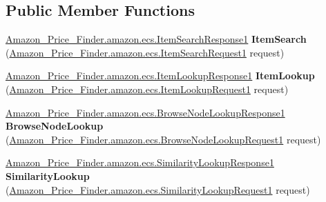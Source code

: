 \subsection*{Public Member Functions}
\begin{DoxyCompactItemize}
\item 
\hypertarget{interface_amazon___price___finder_1_1amazon_1_1ecs_1_1_a_w_s_e_commerce_service_port_type_a4d87bbbe4bbbd83c4d10e0db44b3217e}{\hyperlink{class_amazon___price___finder_1_1amazon_1_1ecs_1_1_item_search_response1}{Amazon\-\_\-\-Price\-\_\-\-Finder.\-amazon.\-ecs.\-Item\-Search\-Response1} {\bfseries Item\-Search} (\hyperlink{class_amazon___price___finder_1_1amazon_1_1ecs_1_1_item_search_request1}{Amazon\-\_\-\-Price\-\_\-\-Finder.\-amazon.\-ecs.\-Item\-Search\-Request1} request)}\label{interface_amazon___price___finder_1_1amazon_1_1ecs_1_1_a_w_s_e_commerce_service_port_type_a4d87bbbe4bbbd83c4d10e0db44b3217e}

\item 
\hypertarget{interface_amazon___price___finder_1_1amazon_1_1ecs_1_1_a_w_s_e_commerce_service_port_type_a297e272c59b05a1d858330541b12323f}{\hyperlink{class_amazon___price___finder_1_1amazon_1_1ecs_1_1_item_lookup_response1}{Amazon\-\_\-\-Price\-\_\-\-Finder.\-amazon.\-ecs.\-Item\-Lookup\-Response1} {\bfseries Item\-Lookup} (\hyperlink{class_amazon___price___finder_1_1amazon_1_1ecs_1_1_item_lookup_request1}{Amazon\-\_\-\-Price\-\_\-\-Finder.\-amazon.\-ecs.\-Item\-Lookup\-Request1} request)}\label{interface_amazon___price___finder_1_1amazon_1_1ecs_1_1_a_w_s_e_commerce_service_port_type_a297e272c59b05a1d858330541b12323f}

\item 
\hypertarget{interface_amazon___price___finder_1_1amazon_1_1ecs_1_1_a_w_s_e_commerce_service_port_type_a74338b088576c8ef7243827a13f98376}{\hyperlink{class_amazon___price___finder_1_1amazon_1_1ecs_1_1_browse_node_lookup_response1}{Amazon\-\_\-\-Price\-\_\-\-Finder.\-amazon.\-ecs.\-Browse\-Node\-Lookup\-Response1} {\bfseries Browse\-Node\-Lookup} (\hyperlink{class_amazon___price___finder_1_1amazon_1_1ecs_1_1_browse_node_lookup_request1}{Amazon\-\_\-\-Price\-\_\-\-Finder.\-amazon.\-ecs.\-Browse\-Node\-Lookup\-Request1} request)}\label{interface_amazon___price___finder_1_1amazon_1_1ecs_1_1_a_w_s_e_commerce_service_port_type_a74338b088576c8ef7243827a13f98376}

\item 
\hypertarget{interface_amazon___price___finder_1_1amazon_1_1ecs_1_1_a_w_s_e_commerce_service_port_type_a4d075270ca3bc355d5a9af8833790f78}{\hyperlink{class_amazon___price___finder_1_1amazon_1_1ecs_1_1_similarity_lookup_response1}{Amazon\-\_\-\-Price\-\_\-\-Finder.\-amazon.\-ecs.\-Similarity\-Lookup\-Response1} {\bfseries Similarity\-Lookup} (\hyperlink{class_amazon___price___finder_1_1amazon_1_1ecs_1_1_similarity_lookup_request1}{Amazon\-\_\-\-Price\-\_\-\-Finder.\-amazon.\-ecs.\-Similarity\-Lookup\-Request1} request)}\label{interface_amazon___price___finder_1_1amazon_1_1ecs_1_1_a_w_s_e_commerce_service_port_type_a4d075270ca3bc355d5a9af8833790f78}


\end{DoxyCompactItemize}
